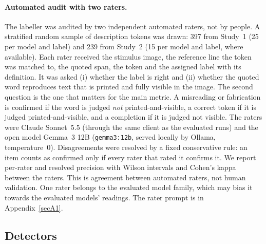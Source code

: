 \documentclass[pdflatex,sn-mathphys-num]{sn-jnl}%
\theoremstyle{thmstyleone}%
\theoremstyle{thmstyletwo}%
\theoremstyle{thmstylethree}%
\newcommand{\RealAudN}{239}
\newcommand{\SynAudN}{397}
\begin{document}
\paragraph{Automated audit with two raters.} The labeller was audited by two independent automated raters, not by people. A stratified random sample of description tokens was drawn: \SynAudN{} from Study~1 (25 per model and label) and \RealAudN{} from Study~2 (15 per model and label, where available). Each rater received the stimulus image, the reference line the token was matched to, the quoted span, the token and the assigned label with its definition. It was asked (i) whether the label is right and (ii) whether the quoted word reproduces text that is printed and fully visible in the image. The second question is the one that matters for the main metric. A misreading or fabrication is confirmed if the word is judged \emph{not} printed-and-visible, a correct token if it is judged printed-and-visible, and a completion if it is judged not visible. The raters were Claude Sonnet~5.5 (through the same client as the evaluated runs) and the open model Gemma~3 12B (\texttt{gemma3:12b}, served locally by Ollama, temperature~0). Disagreements were resolved by a fixed conservative rule: an item counts as confirmed only if every rater that rated it confirms it. We report per-rater and resolved precision with Wilson intervals and Cohen's kappa~\cite{cohen1960coefficient} between the raters. This is agreement between automated raters, not human validation. One rater belongs to the evaluated model family, which may bias it towards the evaluated models' readings. The rater prompt is in Appendix~\ref{secA1}.

\subsection{Detectors}\label{sec:detectors}
\end{document}
